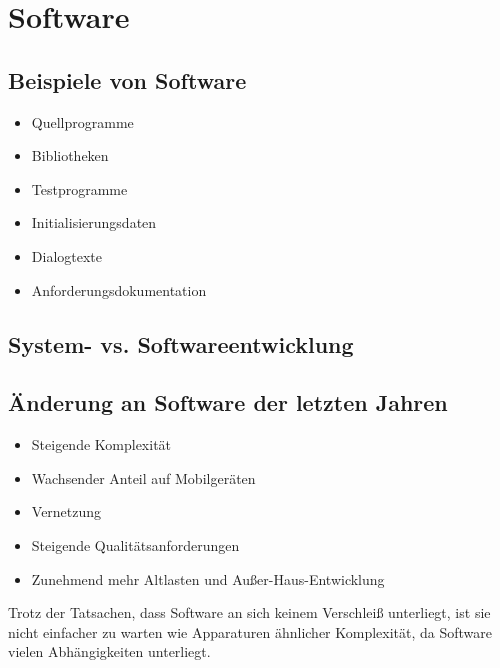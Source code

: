 \section{Software}

\subsection{Beispiele von Software}
\begin{itemize}
    \item Quellprogramme
    \item Bibliotheken
    \item Testprogramme
    \item Initialisierungsdaten
    \item Dialogtexte
    \item Anforderungsdokumentation
\end{itemize}

\subsection{System- vs. Softwareentwicklung}

\subsection{Änderung an Software der letzten Jahren}
\begin{itemize}
    \item Steigende Komplexität 
    \item Wachsender Anteil auf Mobilgeräten
    \item Vernetzung
    \item Steigende Qualitätsanforderungen
    \item Zunehmend mehr Altlasten und Außer-Haus-Entwicklung
\end{itemize}
Trotz der Tatsachen, dass Software an sich keinem Verschleiß unterliegt, ist sie nicht einfacher zu warten wie Apparaturen ähnlicher Komplexität, da Software vielen Abhängigkeiten unterliegt.